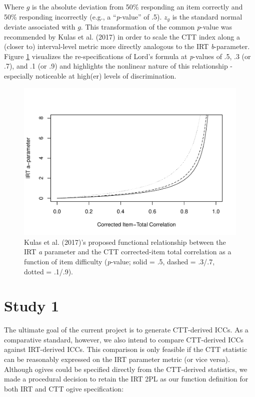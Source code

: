 \documentclass[
  man]{apa6}
\begin{document}
Where \(g\) is the absolute deviation from 50\% responding an item correctly and 50\% responding incorrectly (e.g., a ``\emph{p}-value'' of .5). \(z_g\) is the standard normal deviate associated with \(g\). This transformation of the common \emph{p}-value was recommended by Kulas et al. (2017) in order to scale the CTT index along a (closer to) interval-level metric more directly analogous to the IRT \emph{b}-parameter. Figure \ref{fig:acorrected} visualizes the re-specifications of Lord's formula at \emph{p}-values of .5, .3 (or .7), and .1 (or .9) and highlights the nonlinear nature of this relationship - especially noticeable at high(er) levels of discrimination.

\begin{figure}
\centering
\includegraphics{ICC_project_files/figure-latex/acorrected-1.pdf}
\caption{\label{fig:acorrected}Kulas et al. (2017)'s proposed functional relationship between the IRT \emph{a} parameter and the CTT corrected-item total correlation as a function of item difficulty (\emph{p}-value; solid = .5, dashed = .3/.7, dotted = .1/.9).}
\end{figure}

\hypertarget{study-1}{%
\section{Study 1}\label{study-1}}

The ultimate goal of the current project is to generate CTT-derived ICCs. As a comparative standard, however, we also intend to compare CTT-derived ICCs against IRT-derived ICCs. This comparison is only feasible if the CTT statistic can be reasonably expressed on the IRT parameter metric (or vice versa). Although ogives could be specified directly from the CTT-derived statistics, we made a procedural decision to retain the IRT 2PL as our function definition for both IRT and CTT ogive specification:
\end{document}
